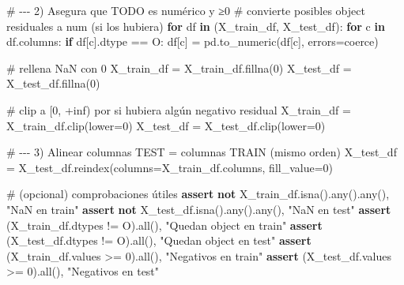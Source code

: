 \documentclass[
  letterpaper,
  DIV=11,
  numbers=noendperiod]{scrartcl}
\newenvironment{Shaded}{\begin{snugshade}}{\end{snugshade}}
\newcommand{\AlertTok}[1]{\textcolor[rgb]{0.68,0.00,0.00}{#1}}
\newcommand{\BuiltInTok}[1]{\textcolor[rgb]{0.00,0.23,0.31}{#1}}
\newcommand{\CommentTok}[1]{\textcolor[rgb]{0.37,0.37,0.37}{#1}}
\newcommand{\ControlFlowTok}[1]{\textcolor[rgb]{0.00,0.23,0.31}{\textbf{#1}}}
\newcommand{\DecValTok}[1]{\textcolor[rgb]{0.68,0.00,0.00}{#1}}
\newcommand{\KeywordTok}[1]{\textcolor[rgb]{0.00,0.23,0.31}{\textbf{#1}}}
\newcommand{\NormalTok}[1]{\textcolor[rgb]{0.00,0.23,0.31}{#1}}
\newcommand{\OperatorTok}[1]{\textcolor[rgb]{0.37,0.37,0.37}{#1}}
\newcommand{\StringTok}[1]{\textcolor[rgb]{0.13,0.47,0.30}{#1}}
\begin{document}
\begin{Shaded}
\begin{Highlighting}[]
\CommentTok{\# {-}{-}{-} 2) Asegura que }\AlertTok{TODO}\CommentTok{ es numérico y ≥0}
\CommentTok{\# convierte posibles \textquotesingle{}object\textquotesingle{} residuales a num (si los hubiera)}
\ControlFlowTok{for}\NormalTok{ df }\KeywordTok{in}\NormalTok{ (X\_train\_df, X\_test\_df):}
    \ControlFlowTok{for}\NormalTok{ c }\KeywordTok{in}\NormalTok{ df.columns:}
        \ControlFlowTok{if}\NormalTok{ df[c].dtype }\OperatorTok{==} \StringTok{\textquotesingle{}O\textquotesingle{}}\NormalTok{:}
\NormalTok{            df[c] }\OperatorTok{=}\NormalTok{ pd.to\_numeric(df[c], errors}\OperatorTok{=}\StringTok{\textquotesingle{}coerce\textquotesingle{}}\NormalTok{)}

\CommentTok{\# rellena NaN con 0}
\NormalTok{X\_train\_df }\OperatorTok{=}\NormalTok{ X\_train\_df.fillna(}\DecValTok{0}\NormalTok{)}
\NormalTok{X\_test\_df  }\OperatorTok{=}\NormalTok{ X\_test\_df.fillna(}\DecValTok{0}\NormalTok{)}

\CommentTok{\# clip a [0, +inf) por si hubiera algún negativo residual}
\NormalTok{X\_train\_df }\OperatorTok{=}\NormalTok{ X\_train\_df.clip(lower}\OperatorTok{=}\DecValTok{0}\NormalTok{)}
\NormalTok{X\_test\_df  }\OperatorTok{=}\NormalTok{ X\_test\_df.clip(lower}\OperatorTok{=}\DecValTok{0}\NormalTok{)}

\CommentTok{\# {-}{-}{-} 3) Alinear columnas }\AlertTok{TEST}\CommentTok{ = columnas TRAIN (mismo orden)}
\NormalTok{X\_test\_df }\OperatorTok{=}\NormalTok{ X\_test\_df.reindex(columns}\OperatorTok{=}\NormalTok{X\_train\_df.columns, fill\_value}\OperatorTok{=}\DecValTok{0}\NormalTok{)}

\CommentTok{\# (opcional) comprobaciones útiles}
\ControlFlowTok{assert} \KeywordTok{not}\NormalTok{ X\_train\_df.isna().}\BuiltInTok{any}\NormalTok{().}\BuiltInTok{any}\NormalTok{(), }\StringTok{"NaN en train"}
\ControlFlowTok{assert} \KeywordTok{not}\NormalTok{ X\_test\_df.isna().}\BuiltInTok{any}\NormalTok{().}\BuiltInTok{any}\NormalTok{(),  }\StringTok{"NaN en test"}
\ControlFlowTok{assert}\NormalTok{ (X\_train\_df.dtypes }\OperatorTok{!=} \StringTok{\textquotesingle{}O\textquotesingle{}}\NormalTok{).}\BuiltInTok{all}\NormalTok{(),   }\StringTok{"Quedan object en train"}
\ControlFlowTok{assert}\NormalTok{ (X\_test\_df.dtypes  }\OperatorTok{!=} \StringTok{\textquotesingle{}O\textquotesingle{}}\NormalTok{).}\BuiltInTok{all}\NormalTok{(),   }\StringTok{"Quedan object en test"}
\ControlFlowTok{assert}\NormalTok{ (X\_train\_df.values }\OperatorTok{\textgreater{}=} \DecValTok{0}\NormalTok{).}\BuiltInTok{all}\NormalTok{(),     }\StringTok{"Negativos en train"}
\ControlFlowTok{assert}\NormalTok{ (X\_test\_df.values  }\OperatorTok{\textgreater{}=} \DecValTok{0}\NormalTok{).}\BuiltInTok{all}\NormalTok{(),     }\StringTok{"Negativos en test"}
\end{Highlighting}
\end{Shaded}
\end{document}
